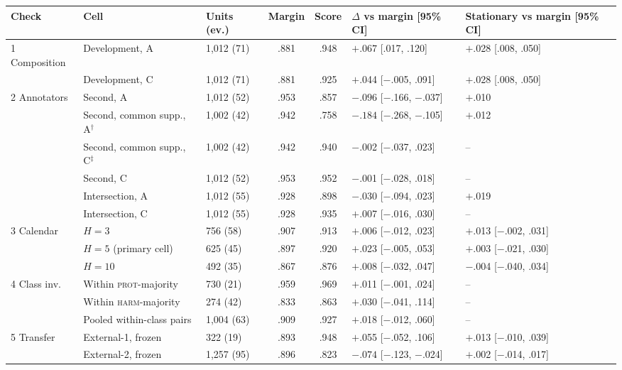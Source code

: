 \documentclass[11pt]{article}
\begin{document}
\begin{table}[!t]\centering\scriptsize
\setlength{\tabcolsep}{3pt}
\begin{tabular}{@{}lllccll@{}}
\toprule
Check & Cell & Units (ev.) & Margin & Score & $\Delta$ vs margin [95\% CI] & Stationary vs margin [95\% CI] \\
\midrule
1 Composition & Development, A & 1{,}012 (71) & .881 & .948 & $\mathbf{+.067}$ [.017, .120] & $+$.028 [.008, .050] \\
 & Development, C & 1{,}012 (71) & .881 & .925 & $+$.044 [$-$.005, .091] & $+$.028 [.008, .050] \\
\midrule
2 Annotators & Second, A & 1{,}012 (52) & .953 & .857 & $\mathbf{-.096}$ [$-$.166, $-$.037] & $+$.010 \\
 & Second, common supp., A$^{\dagger}$ & 1{,}002 (42) & .942 & .758 & $\mathbf{-.184}$ [$-$.268, $-$.105] & $+$.012 \\
 & Second, common supp., C$^{\ddagger}$ & 1{,}002 (42) & .942 & .940 & $-$.002 [$-$.037, .023] & -- \\
 & Second, C & 1{,}012 (52) & .953 & .952 & $-$.001 [$-$.028, .018] & -- \\
 & Intersection, A & 1{,}012 (55) & .928 & .898 & $-$.030 [$-$.094, .023] & $+$.019 \\
 & Intersection, C & 1{,}012 (55) & .928 & .935 & $+$.007 [$-$.016, .030] & -- \\
\midrule
3 Calendar & $H{=}3$ & 756 (58) & .907 & .913 & $+$.006 [$-$.012, .023] & $+$.013 [$-$.002, .031] \\
 & $H{=}5$ (primary cell) & 625 (45) & .897 & .920 & $+$.023 [$-$.005, .053] & $+$.003 [$-$.021, .030] \\
 & $H{=}10$ & 492 (35) & .867 & .876 & $+$.008 [$-$.032, .047] & $-$.004 [$-$.040, .034] \\
\midrule
4 Class inv. & Within \textsc{prot}-majority & 730 (21) & .959 & .969 & $+$.011 [$-$.001, .024] & -- \\
 & Within \textsc{harm}-majority & 274 (42) & .833 & .863 & $+$.030 [$-$.041, .114] & -- \\
 & Pooled within-class pairs & 1{,}004 (63) & .909 & .927 & $+$.018 [$-$.012, .060] & -- \\
\midrule
5 Transfer & External-1, frozen & 322 (19) & .893 & .948 & $+$.055 [$-$.052, .106] & $+$.013 [$-$.010, .039] \\
 & External-2, frozen & 1{,}257 (95) & .896 & .823 & $\mathbf{-.074}$ [$-$.123, $-$.024] & $+$.002 [$-$.014, .017] \\

\end{tabular}
\end{table}
\end{document}
